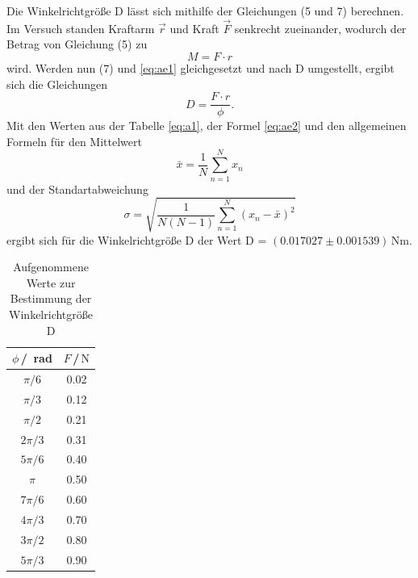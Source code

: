 Die Winkelrichtgröße D lässt sich mithilfe der Gleichungen (5 und 7) berechnen. Im Versuch standen 
Kraftarm $\vec{r}$ und Kraft $\vec{F}$ senkrecht zueinander, wodurch der Betrag von Gleichung (5) 
zu
\begin{equation}
    M = F \cdot r
    \label{eq:ae1}
\end{equation}
\noindent
wird. Werden nun (7) und \ref{eq:ae1} gleichgesetzt und nach D umgestellt, ergibt sich die Gleichungen
\begin{equation}
    D = \frac{F\cdot r}{\phi}.
    \label{eq:ae2}
\end{equation}
\noindent
Mit den Werten aus der Tabelle \ref{eq:a1}, der Formel \ref{eq:ae2} und den allgemeinen Formeln für den Mittelwert
\begin{equation}
    \bar{x} = \frac{1}{N} \sum_{n=1}^N x_n 
    \label{eq:ae3}
\end{equation}
\noindent
und der Standartabweichung
\begin{equation}
    \sigma = \sqrt{\frac{1}{N(N-1)} \sum_{n=1}^N (x_n - \bar{x})^2}
\end{equation}
\noindent
ergibt sich für die Winkelrichtgröße D der Wert D = $(0.017027 \pm 0.001539)\,$Nm.

\begin{table}[H]
\normalsize

\centering
{}
\begin{tabular}{c c}
\toprule
    $\phi$\,/\, rad & $F$\,/\,$\si{\newton}$ \\
    \midrule

$\pi/6$  &   0.02   \\
$\pi/3$  &   0.12   \\
$\pi/2$  &   0.21   \\
$2\pi/3$ &   0.31   \\
$5\pi/6$ &   0.40   \\
$\pi$    &   0.50   \\
$7\pi/6$ &   0.60   \\
$4\pi/3$ &   0.70   \\
$3\pi/2$ &   0.80   \\
$5\pi/3$ &   0.90   \\ 

    \bottomrule
\end{tabular}
\caption{Aufgenommene Werte zur Bestimmung der Winkelrichtgröße D}
\label{tab:a1}
\end{table}

















